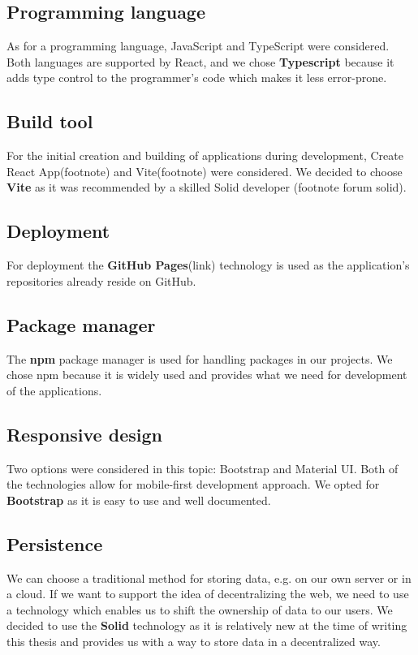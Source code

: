 \subsection*{Programming language}
As for a programming language, JavaScript and TypeScript were considered.
Both languages are supported by React, and we chose \textbf{Typescript} because it adds type control to the programmer's code which makes it less error-prone.

\subsection*{Build tool}
For the initial creation and building of applications during development, Create React App(footnote) and Vite(footnote) were considered.
We decided to choose \textbf{Vite} as it was recommended by a skilled Solid developer (footnote forum solid). 

\subsection*{Deployment}
For deployment the \textbf{GitHub Pages}(link) technology is used as the application's repositories already reside on GitHub.

\subsection*{Package manager}
The \textbf{npm} package manager is used for handling packages in our projects.
We chose npm because it is widely used and provides what we need for development of the applications. 

\subsection*{Responsive design}
Two options were considered in this topic: Bootstrap and Material UI.
Both of the technologies allow for mobile-first development approach.
We opted for \textbf{Bootstrap} as it is easy to use and well documented.

\subsection*{Persistence}
We can choose a traditional method for storing data, e.g. on our own server or in a cloud.
If we want to support the idea of decentralizing the web, we need to use a technology which enables us to shift the ownership of data to our users.
We decided to use the \textbf{Solid} technology as it is relatively new at the time of writing this thesis and provides us with a way to store data in a decentralized way.

